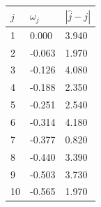 \begin{tabular}{|l|l|l|}
\hline
$j$ & $\omega_j$ & $|\hat j-j|$ \\
\hline
1 & 0.000 & 3.940 \\
\hline
2 & -0.063 & 1.970 \\
\hline
3 & -0.126 & 4.080 \\
\hline
4 & -0.188 & 2.350 \\
\hline
5 & -0.251 & 2.540 \\
\hline
6 & -0.314 & 4.180 \\
\hline
7 & -0.377 & 0.820 \\
\hline
8 & -0.440 & 3.390 \\
\hline
9 & -0.503 & 3.730 \\
\hline
10 & -0.565 & 1.970 \\
\hline
\end{tabular}
